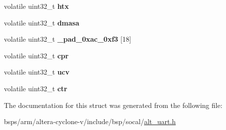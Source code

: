 \begin{DoxyCompactItemize}
\mbox{\label{structALT__UART__raw__s_a92f7fc9c5a16599e848f11104020bd52}} 
volatile uint32\+\_\+t {\bfseries htx}
\item 
\mbox{\label{structALT__UART__raw__s_a0270559a1c30495ce4305e67ada264f2}} 
volatile uint32\+\_\+t {\bfseries dmasa}
\item 
\mbox{\label{structALT__UART__raw__s_aa8c024eb2ba90178045a9f437e9ce400}} 
volatile uint32\+\_\+t {\bfseries \+\_\+pad\+\_\+0xac\+\_\+0xf3} \mbox{[}18\mbox{]}
\item 
\mbox{\label{structALT__UART__raw__s_a16a65e9b19605710274022c954745eb2}} 
volatile uint32\+\_\+t {\bfseries cpr}
\item 
\mbox{\label{structALT__UART__raw__s_a043021f3501cfc22bd12d382ce7694a4}} 
volatile uint32\+\_\+t {\bfseries ucv}
\item 
\mbox{\label{structALT__UART__raw__s_ab7952536fdf0b6243246326dd996c9da}} 
volatile uint32\+\_\+t {\bfseries ctr}
\end{DoxyCompactItemize}


The documentation for this struct was generated from the following file\+:\begin{DoxyCompactItemize}
\item 
bsps/arm/altera-\/cyclone-\/v/include/bsp/socal/\mbox{\hyperlink{alt__uart_8h}{alt\+\_\+uart.\+h}}\end{DoxyCompactItemize}
